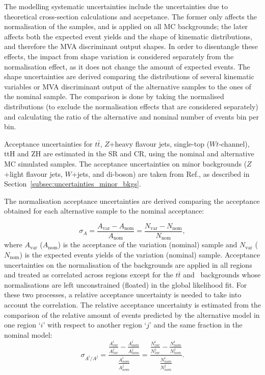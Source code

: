 The modelling systematic uncertainties include the 
uncertainties due to theoretical cross-section calculations
and accpetance. The former only affects the normalisation of the
samples, and is applied on all MC backgrounds; the later
affects both the expected event yields and the shape of
kinematic distributions, and therefore the MVA discriminant output
shapes. In order to disentangle these effects, the 
impact from shape variation is considered 
separately from the normalisation effect,
as it does not change the amount of expected events.
The shape uncertainties are derived comparing the 
distributions of several kinematic variables or MVA 
discriminant output of the alternative samples to the ones of the nominal sample. 
The comparison is done by taking the normalised distributions 
(to exclude the normalisation effects that are 
considered separately) and calculating the ratio of 
the alternative and nominal number of events bin per bin. 

Acceptance uncertainties for $t\bar{t}$, $Z$+heavy flavour jets, 
single-top ($Wt$-channel), ttH and ZH are estimated in the SR and CR, 
using the nominal and alternative MC simulated samples. 
The acceptance uncertainties on minor 
backgrounds ($Z$+light flavour jets, $W$+jets, and di-boson) 
are taken from Ref.\cite{ATLAS-CONF-2020-006}, as 
described in Section~\ref{subsec:uncertainties_minor_bkgs}. 

The normalisation acceptance uncertainties are derived comparing the 
acceptance obtained for each alternative sample 
to the nominal acceptance:

\begin{equation}
    \sigma_{A}= \frac{A_\text{var} - A_\text{nom}}{A_\text{nom}} = \frac{N_\text{var}-N_\text{nom}}{N_\text{nom}},
    \label{eq:acceptance_unc}
\end{equation}
where $A_\text{var}$ ($A_\text{nom}$) is the acceptance of the 
variation (nominal) sample and  $N_\text{var}$ ($N_\text{nom}$) 
is the expected events yields of the variation (nominal) sample. 
Acceptance uncertainties on the normalisation of the 
backgrounds are applied in all regions and 
treated as correlated across regions except for the 
$t\bar{t}$ and \ZHF\ backgrounds whose normalisations 
are left unconstrained (floated) in the global likelihood fit. 
For these two processes, a relative acceptance uncertainty is needed
to take into account the correlation.
The relative acceptance uncertainty is estimated
from the comparison of the relative amount of events predicted by the 
alternative model in one region `$i$' with 
respect to another region `$j$' and the same fraction 
in the nominal model:
\begin{equation}
\sigma_{A^i/A^j}= \frac{\frac{A_{var}^i}{A_{var}^j} - \frac{A_{nom}^i}{A_{nom}^j}}
{\frac{A_{nom}^i}{A_{nom}^j}} = 
\frac{ \frac{N_{var}^i}{N_{var}^j} - \frac{N_{nom}^i}{N_{nom}^j} } {\frac{N_{nom}^i}{N_{nom}^j}}.
\label{eq:relative_acceptance_unc}
\end{equation}

